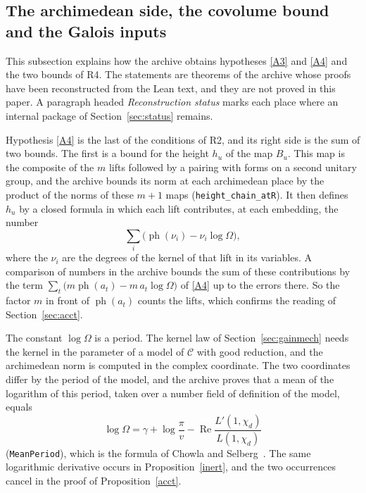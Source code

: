 \documentclass[11pt,letterpaper]{article}
\numberwithin{equation}{section}
\begin{document}
\subsection{The archimedean side, the covolume bound and the Galois inputs}\label{sec:archside}

This subsection explains how the archive obtains hypotheses \eqref{A3} and \eqref{A4} and the two bounds of R4. The statements are theorems of the archive whose proofs have been reconstructed from the Lean text, and they are not proved in this paper. A paragraph headed \emph{Reconstruction status} marks each place where an internal package of Section~\ref{sec:status} remains.

Hypothesis \eqref{A4} is the last of the conditions of R2, and its right side is the sum of two bounds. The first is a bound for the height $h_u$ of the map $B_u$. This map is the composite of the $m$ lifts followed by a pairing with forms on a second unitary group, and the archive bounds its norm at each archimedean place by the product of the norms of these $m+1$ maps (\texttt{height\_chain\_atR}). It then defines $h_u$ by a closed formula in which each lift contributes, at each embedding, the number
\[
\sum_i\big(\operatorname{ph}(\nu_i)-\nu_i\log\Omega\big),
\]
where the $\nu_i$ are the degrees of the kernel of that lift in its variables. A comparison of numbers in the archive bounds the sum of these contributions by the term $\sum_t\big(m\operatorname{ph}(a_t)-m\,a_t\log\Omega\big)$ of \eqref{A4} up to the errors there. So the factor $m$ in front of $\operatorname{ph}(a_t)$ counts the lifts, which confirms the reading of Section~\ref{sec:acct}.

The constant $\log\Omega$ is a period. The kernel law of Section~\ref{sec:gainmech} needs the kernel in the parameter of a model of $\mathcal C$ with good reduction, and the archimedean norm is computed in the complex coordinate. The two coordinates differ by the period of the model, and the archive proves that a mean of the logarithm of this period, taken over a number field of definition of the model, equals
\[
\log\Omega=\gamma+\log\frac{\pi}{v}-\operatorname{Re}\frac{L'(1,\chi_d)}{L(1,\chi_d)}
\]
(\texttt{MeanPeriod}), which is the formula of Chowla and Selberg~\cite{chowlaselberg}. The same logarithmic derivative occurs in Proposition~\ref{inert}, and the two occurrences cancel in the proof of Proposition~\ref{acct}.
\end{document}
